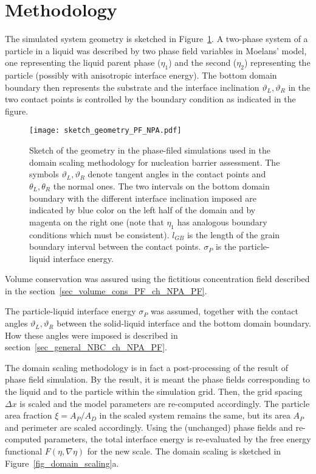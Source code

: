 \section{Methodology}
The simulated system geometry is sketched in Figure~\ref{fig_sketch_domain_scaling_PF}. A two-phase system of a particle in a liquid was described by two phase field variables in Moelans' model, one representing the liquid parent phase ($\eta_1$) and the second ($\eta_2$) representing the particle (possibly with anisotropic interface energy). The bottom domain boundary then represents the substrate and the interface inclination $\vartheta_L,\vartheta_R$ in the two contact points is controlled by the boundary condition as indicated in the figure.
\begin{figure}
	\centering
	\texttt{[image: sketch\_geometry\_PF\_NPA.pdf]}
	\caption{Sketch of the geometry in the phase-filed simulations used in the domain scaling methodology for nucleation barrier assessment. The symbols $\vartheta_L,\vartheta_R$ denote tangent angles in the contact points and $\theta_L,\theta_R$ the normal ones. The two intervals on the bottom domain boundary with the different interface inclination imposed are indicated  by blue color on the left half of the domain and by magenta on the right one (note that $\eta_1$ has analogous boundary conditions which must be consistent). $l_{GB}$ is the length of the grain boundary interval between the contact points. $\sigma_P$ is the particle-liquid interface energy.}
	\label{fig_sketch_domain_scaling_PF}
\end{figure}

Volume conservation was assured using the fictitious concentration field described in the section~\ref{sec_volume_cons_PF_ch_NPA_PF}. 

The particle-liquid interface energy $\sigma_P$ was assumed, together with the contact angles $\vartheta_L, \vartheta_R$ between the solid-liquid interface and the bottom domain boundary. How these angles were imposed is described in section~\ref{sec_general_NBC_ch_NPA_PF}.

The domain scaling methodology is in fact a post-processing of the result of phase field simulation. By the result, it is meant the phase fields corresponding to the liquid and to the particle within the simulation grid. Then, the grid spacing $\Delta x$ is scaled and the model parameters are re-computed accordingly. The particle area fraction $\xi=A_P/A_D$ in the scaled system remains the same, but its area $A_P$ and perimeter are scaled accordingly. Using the (unchanged) phase fields and re-computed parameters, the total interface energy is re-evaluated by the free energy functional $F(\eta,\nabla\eta)$ for the new scale. The domain scaling is sketched in Figure~\ref{fig_domain_scaling}a. 

